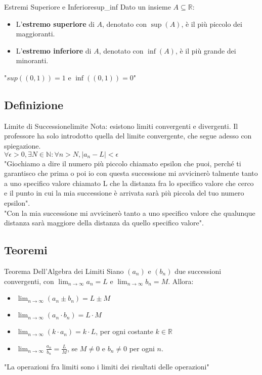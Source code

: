 \documentclass{article}
\begin{document}
\begin{definition}{Estremi Superiore e Inferiore}{sup_inf}
    Dato un insieme $A \subseteq \mathbb{R}$:
    \begin{itemize}
        \item L'\textbf{estremo superiore} di $A$, denotato con $\sup(A)$, è il più piccolo dei maggioranti.
        \item L'\textbf{estremo inferiore} di $A$, denotato con $\inf(A)$, è il più grande dei minoranti.
    \end{itemize}
    "$sup((0,1)) = 1$ e $\inf((0,1)) = 0$"
\end{definition}


\subsection{Definizione}

\begin{definition}{Limite di Successione}{limite}
    Nota: esistono limiti convergenti e divergenti. Il professore ha solo introdotto quella del limite convergente, che segue adesso con spiegazione.
    \\[1em]
    $\forall \epsilon > 0, \exists N \in \mathbb{N} : \forall n > N, |a_n - L| < \epsilon$
    \\[1em]
    "Giochiamo a dire il numero più piccolo chiamato epsilon che puoi, perché ti garantisco che prima o poi io con questa successione mi avvicinerò talmente tanto a uno specifico valore chiamato L che la distanza fra lo specifico valore che cerco e il punto in cui la mia successione è arrivata sarà più piccola del tuo numero epsilon".
    \\[1em]
    "Con la mia successione mi avvicinerò tanto a uno specifico valore che qualunque distanza sarà maggiore della distanza da quello specifico valore".
\end{definition}

\subsection{Teoremi}

\begin{theorem}{Teorema Dell'Algebra dei Limiti}{}
    Siano $(a_n)$ e $(b_n)$ due successioni convergenti, con $\lim_{n \to \infty} a_n = L$ e $\lim_{n \to \infty} b_n = M$. Allora:
    \begin{itemize}
        \item $\lim_{n \to \infty} (a_n \pm b_n) = L \pm M$
        \item $\lim_{n \to \infty} (a_n \cdot b_n) = L \cdot M$
        \item $\lim_{n \to \infty} (k \cdot a_n) = k \cdot L$, per ogni costante $k \in \mathbb{R}$
        \item $\lim_{n \to \infty} \frac{a_n}{b_n} = \frac{L}{M}$, se $M \neq 0$ e $b_n \neq 0$ per ogni $n$.
    \end{itemize}

    "La operazioni fra limiti sono i limiti dei risultati delle operazioni"
\end{theorem}
\end{document}
